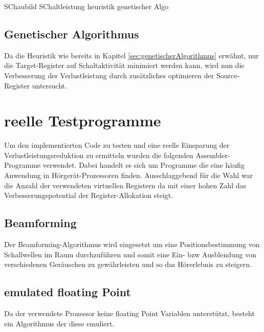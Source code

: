 SChaubild SChaltleistung heuristik genetischer Algo

\subsection{Genetischer Algorithmus}
Da die Heuristik wie bereits in Kapitel \ref{sec:genetischerAlgorithmus} erwähnt, nur die Target-Register auf Schaltaktivität minimiert werden kann, wird nun die Verbesserung der Verlustleistung durch zusätzliches optimieren der Source-Register untersucht. 

 

\section{reelle Testprogramme}
\label{sec:testprogamme}
Um den implementierten Code zu testen und eine reelle Einsparung der Verlustleistungsreduktion zu ermitteln wurden die folgenden Assembler-Programme verwendet. Dabei handelt es sich um Programme die eine häufig Anwendung in Hörgerät-Prozessoren finden. Ausschlaggebend für die Wahl war die Anzahl der verwendeten virtuellen Registern da mit einer hohen Zahl das Verbesserungspotential der Register-Allokation steigt.
\subsection{Beamforming}
Der Beamforming-Algorithmus wird eingesetzt um eine Positionsbestimmung von Schallwellen im Raum durchzuführen und somit eine Ein- bzw Ausblendung von verschiedenen Geräuschen zu gewährleisten und so das Hörerlebnis zu steigern. 

\subsection{emulated floating Point}
Da der verwendete Prozessor keine floating Point Variablen unterstützt, besteht ein Algorithmus der diese emuliert. 


